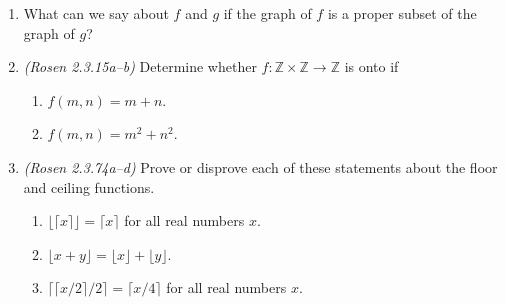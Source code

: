 \documentclass{article}
\newcommand{\ZZ}{\mathbb{Z}}
\begin{document}
\begin{enumerate}
\item What can we say about $f$ and $g$ if the graph of $f$ is a proper subset of the graph of $g$?

\item {\em (Rosen 2.3.15a--b)} Determine whether $f: \ZZ \times \ZZ \to \ZZ$ is onto if
\begin{enumerate}
\item $f(m, n) = m + n$.
\item $f(m, n) = m^2 + n^2$.
\end{enumerate}

\item {\em (Rosen 2.3.74a--d)} Prove or disprove each of these statements about the floor and ceiling functions.
\begin{enumerate}
\item $\lfloor \lceil x \rceil \rfloor = \lceil x \rceil$ for all real numbers $x$.
\item $\lfloor x + y \rfloor = \lfloor x \rfloor + \lfloor y \rfloor$.
\item $\lceil \lceil x/2 \rceil / 2 \rceil = \lceil x / 4 \rceil$ for all real numbers $x$.
\end{enumerate}

\end{enumerate}
\end{document}
